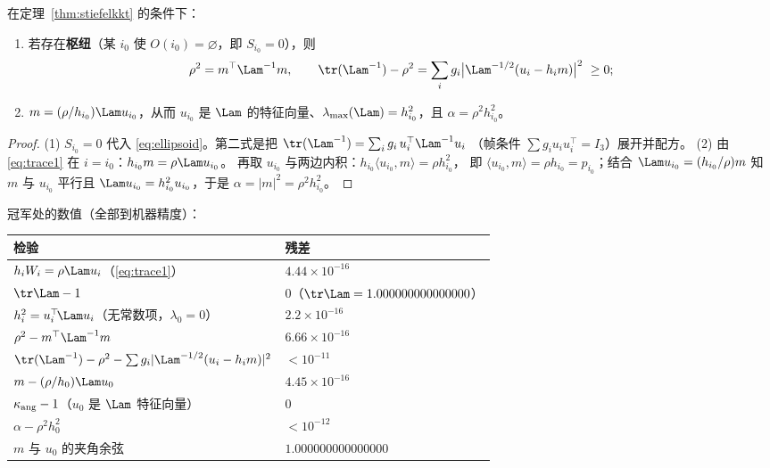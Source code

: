 \begin{corollary}\label{cor:hubfree}
在定理~\ref{thm:stiefelkkt} 的条件下：
\begin{enumerate}\itemsep1pt
\item 若存在\textbf{枢纽}（某 $i_0$ 使 $O(i_0)=\varnothing$，即 $S_{i_0}=0$），则
\begin{equation}\label{eq:hubfree}
\rho^2=m^\top\Lam^{-1}m,\qquad
\tr(\Lam^{-1})-\rho^2=\sum_ig_i\bigl|\Lam^{-1/2}(u_i-h_im)\bigr|^2\ \ge0 ;
\end{equation}
\item $m=(\rho/h_{i_0})\Lam u_{i_0}$，从而 $u_{i_0}$ 是 $\Lam$ 的特征向量、$\lambda_{\max}(\Lam)=h_{i_0}^2$，且
$\alpha=\rho^2h_{i_0}^2$。
\end{enumerate}
\end{corollary}

\begin{proof}
(1) $S_{i_0}=0$ 代入 \eqref{eq:ellipsoid}。第二式是把 $\tr(\Lam^{-1})=\sum_ig_i\,u_i^\top\Lam^{-1}u_i$
（帧条件 $\sum g_iu_iu_i^\top=I_3$）展开并配方。
(2) 由 \eqref{eq:trace1} 在 $i=i_0$：$h_{i_0}m=\rho\Lam u_{i_0}$。
再取 $u_{i_0}$ 与两边内积：$h_{i_0}\langle u_{i_0},m\rangle=\rho h_{i_0}^2$，
即 $\langle u_{i_0},m\rangle=\rho h_{i_0}=p_{i_0}$；结合 $\Lam u_{i_0}=(h_{i_0}/\rho)m$ 知
$m$ 与 $u_{i_0}$ 平行且 $\Lam u_{i_0}=h_{i_0}^2u_{i_0}$，于是 $\alpha=|m|^2=\rho^2h_{i_0}^2$。
\end{proof}

冠军处的数值（全部到机器精度）：
\begin{center}\small
\begin{tabular}{ll}
\hline
检验 & 残差 \\
\hline
$h_iW_i=\rho\Lam u_i$（\eqref{eq:trace1}） & $4.44\times10^{-16}$ \\
$\tr\Lam-1$ & $0$（$\tr\Lam=1.000000000000000$） \\
$h_i^2=u_i^\top\!\Lam u_i$（无常数项，$\lambda_0=0$） & $2.2\times10^{-16}$ \\
$\rho^2-m^\top\Lam^{-1}m$ & $6.66\times10^{-16}$ \\
$\tr(\Lam^{-1})-\rho^2-\sum g_i|\Lam^{-1/2}(u_i-h_im)|^2$ & $<10^{-11}$ \\
$m-(\rho/h_0)\Lam u_0$ & $4.45\times10^{-16}$ \\
$\kappa_{\rm ang}-1$（$u_0$ 是 $\Lam$ 特征向量） & $0$ \\
$\alpha-\rho^2h_0^2$ & $<10^{-12}$ \\
$m$ 与 $u_0$ 的夹角余弦 & $1.000000000000000$ \\
\hline
\end{tabular}
\end{center}

